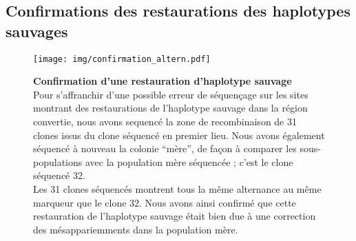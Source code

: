 \subsection{Confirmations des restaurations des haplotypes sauvages}
\label{subsec:confirm-haplotype}

\begin{figure}[ht]
  \centering
  \texttt{[image: img/confirmation\_altern.pdf]}
  \caption[Confirmation des restaurations]{\label{fig:confirm-haplotype}
    \textbf{Confirmation d'une restauration d'haplotype sauvage} \\
    \rmfamily Pour s'affranchir d'une possible erreur de séquençage sur les
    sites montrant des restaurations de l'haplotype sauvage dans la région convertie, nous avons
    sequencé la zone de recombinaison de 31 clones issus du clone séquencé en
    premier lieu. Nous avons également séquencé à nouveau la colonie ``mère'',
    de façon à comparer les sous-populations avec la population mère séquencée ;
    c'est le clone séquencé \num{32}.
    \\
    Les 31 clones séquencés montrent tous la même alternance au même marqueur
    que le clone 32.
    Nous avons ainsi confirmé que cette restauration de l'haplotype sauvage
    était bien due à une correction des mésappariemments dans la population
    mère.
  }
\end{figure}


